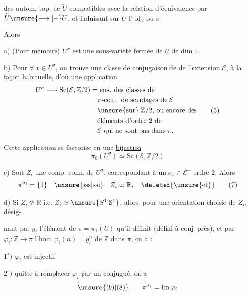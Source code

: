 
des autom. top. de $\widetilde U$ compatibles avec la
relation d'équivalence  par $\widetilde U\unsure{\longrightarrow|-}U$, et
induisant sur $U$ l' $\mathrm{id}_U$ ou $\sigma$.

 Alors

a) (Pour mémoire) $U^\sigma$ est une sous-variété fermée
de $U$ de dim 1.

b) Pour $\forall\ x\in U^\sigma$, on trouve une classe
de \inserted{$\pi$-}conjugaison de  de l'extension
$\mathcal E$, à la façon habituelle, d'où une
application
\[
 \begin{aligned}
 U^\sigma\longrightarrow\mathrm{Sc}(\mathcal E,\mathbb Z/2)
 &=\text{ens. des classes de}\\
 &\quad\text{$\pi$-conj. de scindages de $\mathcal E$}\\
 &\quad\text{\unsure{sur} $\mathbb Z/2$, ou encore des}\\
 &\quad\text{éléments d'ordre $2$ de}\\
 &\quad\text{$\mathcal E$ qui ne sont pas dans $\pi$.}
 \end{aligned}
 \tag{5}
\]

Cette application se factorise en une
\uline{bijection}
\[
 \pi_0(U^\sigma)\simeq\mathrm{Sc}(\mathcal E,\mathbb Z/2)
 \tag{6}
\]

c) Soit $Z_i$ une comp. conn. de $U^\sigma$,
correspondant à un  $\sigma_i\in\mathcal E^-$ 
ordre $2$. Alors 
\[
 \pi^{\sigma_i}=\{1\}\quad\text{\unsure{sss|ssi}}\quad Z_i\simeq\mathbb R,
 \quad\deleted{\unsure{\text{et}}}
 \tag{7}
\]

d) Si $Z_i\not\simeq\mathbb R$ i.e.  $Z_i\simeq\unsure{S^1|\mathbb S^1}$, alors,
pour une orientation choisie de $Z_i$, désig-

nant par $g_i$ l'élément de $\pi=\pi_1(U)$
qu'il définit (défini à conj. près), et
par $\varphi_i:\mathbb Z\longrightarrow\pi$ l'hom $\varphi_i(n)=g_i^n$ de
$\mathbb Z$ dans $\pi$, on a :

$1^\circ)$ $\varphi_i$ est injectif

$2^\circ)$ quitte à remplacer $\varphi_i$ par un conjugué,
on a
\[
\unsure{(9)|(8)}\qquad \pi^{\sigma_i}=\operatorname{Im}\varphi_i
\]

